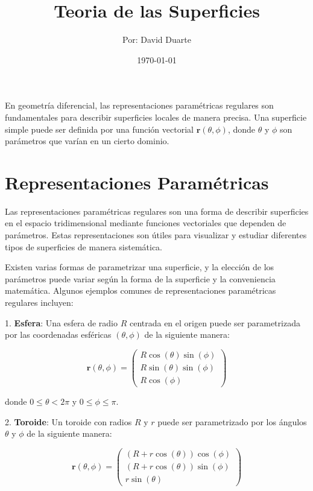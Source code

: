 \documentclass{article}
\begin{document}
	
	\title{Teoria de las Superficies}
	\author{Por: David Duarte}
	\date{\today}
	
	\maketitle
	

	
	En geometría diferencial, las representaciones paramétricas regulares son fundamentales para describir superficies locales de manera precisa. Una superficie simple puede ser definida por una función vectorial $	\textbf{r}(\theta, \phi)$, donde $\theta$ y $\phi$ son parámetros que varían en un cierto dominio. 
	
	\section{Representaciones Paramétricas}
		
		Las representaciones paramétricas regulares son una forma de describir superficies en el espacio tridimensional mediante funciones vectoriales que dependen de parámetros. Estas representaciones son útiles para visualizar y estudiar diferentes tipos de superficies de manera sistemática.
		
		Existen varias formas de parametrizar una superficie, y la elección de los parámetros puede variar según la forma de la superficie y la conveniencia matemática. Algunos ejemplos comunes de representaciones paramétricas regulares incluyen:
		
		1. \textbf{Esfera}: Una esfera de radio $R$ centrada en el origen puede ser parametrizada por las coordenadas esféricas $(\theta, \phi)$ de la siguiente manera:
		
		$$
		\textbf{r}(\theta, \phi) = \begin{pmatrix} R \cos(\theta) \sin(\phi) \\ R \sin(\theta) \sin(\phi) \\ R \cos(\phi) \end{pmatrix}
		$$
		
		donde $0 \leq \theta < 2\pi$ y $0 \leq \phi \leq \pi$.
		
		2. \textbf{Toroide}: Un toroide con radios $R$ y $r$ puede ser parametrizado por los ángulos $\theta$ y $\phi$ de la siguiente manera:
		
		$$
		\textbf{r}(\theta, \phi) = \begin{pmatrix} (R + r \cos(\theta)) \cos(\phi) \\ (R + r \cos(\theta)) \sin(\phi) \\ r \sin(\theta) \end{pmatrix}
		$$
		
\end{document}

